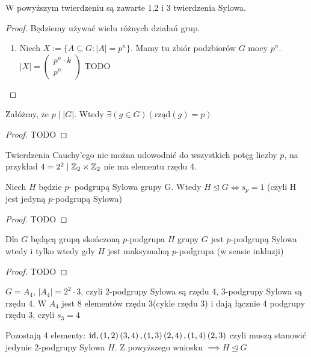 W powyższym twierdzeniu są zawarte 1,2 i 3 twierdzenia Sylowa.
\begin{proof}
	Będziemy używać wielu różnych działań grup.
	\begin{enumerate}[label=\arabic*.]
		\item Niech $X:= \{A\subseteq G: \left| A \right| = p^{n}\} $. Mamy tu zbiór podzbiorów $G$ mocy $p^{n}$.
			$\left| X \right| = \begin{pmatrix} p^{n}\cdot k \\ p^{n} \end{pmatrix} $ TODO
	\end{enumerate}
\end{proof} 

\begin{theorem}
	Załóżmy, że $p\mid \left| G \right| $. Wtedy $\exists\left( g\in G \right)\left( \text{rząd}\left( g \right) = p\right)  $
\end{theorem} 
\begin{proof}
	TODO
\end{proof} 
\begin{remark}
	Twierdzenia Cauchy'ego nie można udowodnić do wszystkich potęg liczby $p$, na przykład $4=2^2 \mid \mathbb{Z}_2\times \mathbb{Z}_2$ nie ma elementu rzędu 4.
\end{remark}
\begin{theorem}
	Niech $H$ będzie $p $- podgrupą Sylowa grupy G. Wtedy $H\unlhd G \iff s_{p}=1$ (czyli H jest jedyną $p$-podgrupą Sylowa)
\end{theorem} 
\begin{proof}
	TODO
\end{proof} 
\begin{theorem}
	Dla $G$ będącą grupą skończoną $p$-podgrupa $H$ grupy $G$ jest $p$-podgrupą Sylowa wtedy i tylko wtedy gdy $H$ jest maksymalną $p$-podgrupa
	(w sensie inkluzji)
\end{theorem} 
\begin{proof}
	TODO
\end{proof} 
\begin{eg}
	$G=A_4$, $\left| A_4 \right| = 2^2\cdot 3$, czyli 2-podgrupy Sylowa są rzędu 4, 3-podgrupy Sylowa są rzędu 4.
	W $A_4$ jest 8 elementów rzędu 3(cykle rzędu 3) i dają łącznie 4 podgrupy rzędu 3, czyli $s_{3} = 4$

	Pozostają 4 elementy: $\operatorname{id},\left( 1,2 \right)\left( 3,4 \right) , \left( 1,3 \right) \left( 2,4 \right) , \left( 1,4 \right)\left( 2,3 \right) $ 
	czyli muszą stanowić jedynie 2-podgrupy Sylowa $H$. Z powyższego wniosku $\implies H\unlhd G$
\end{eg} 

